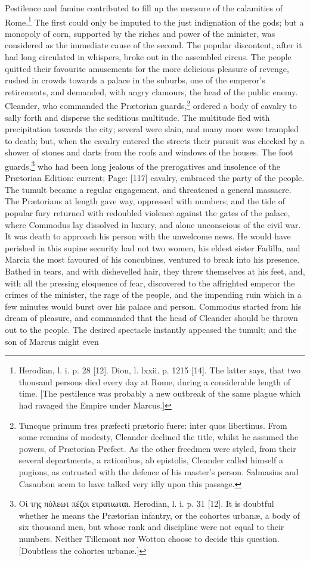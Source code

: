 Pestilence and famine contributed to fill up the measure of the calamities of Rome.\footnote{Herodian, l. i. p. 28 [12]. Dion, l. lxxii. p. 1215 [14]. The latter says, that two thousand persons died every day at Rome, during a considerable length of time. [The pestilence was probably a new outbreak of the same plague which had ravaged the Empire under Marcus.]} The first could only be imputed to the just indignation of the gods; but a monopoly of corn, supported by the riches and power of the minister, was considered as the immediate cause of the second. The popular discontent, after it had long circulated in whispers, broke out in the assembled circus. The people quitted their favourite amusements for the more delicious pleasure of revenge, rushed in crowds towards a palace in the suburbs, one of the emperor\texthebrew{}’s retirements, and demanded, with angry clamours, the head of the public enemy. Cleander, who commanded the Prætorian guards,\footnote{Tuncque primum tres præfecti prætorio fuere: inter quos libertinus. From some remains of modesty, Cleander declined the title, whilst he assumed the powers, of Prætorian Prefect. As the other freedmen were styled, from their several departments, a rationibus, ab epistolis, Cleander called himself a pugions, as entrusted with the defence of his master\texthebrew{}’s person. Salmasius and Casaubon seem to have talked very idly upon this passage.} ordered a body of cavalry to sally forth and disperse the seditious multitude. The multitude fled with precipitation towards the city; several were slain, and many more were trampled to death; but, when the cavalry entered the streets their pursuit was checked by a shower of stones and darts from the roofs and windows of the houses. The foot guards,\footnote{\textgreek{Ο\texthebrew{ἰ} της πόλεωτ πέζοι ετρατιωται}. Herodian, l. i. p. 31 [12]. It is doubtful whether he means the Prætorian infantry, or the cohortes urbanæ, a body of six thousand men, but whose rank and discipline were not equal to their numbers. Neither Tillemont nor Wotton choose to decide this question. [Doubtless the cohortes urbanæ.]} who had been long jealous of the prerogatives and insolence of the Prætorian Edition: current; Page: [117] cavalry, embraced the party of the people. The tumult became a regular engagement, and threatened a general massacre. The Prætorians at length gave way, oppressed with numbers; and the tide of popular fury returned with redoubled violence against the gates of the palace, where Commodus lay dissolved in luxury, and alone unconscious of the civil war. It was death to approach his person with the unwelcome news. He would have perished in this supine security had not two women, his eldest sister Fadilla, and Marcia the most favoured of his concubines, ventured to break into his presence. Bathed in tears, and with dishevelled hair, they threw themselves at his feet, and, with all the pressing eloquence of fear, discovered to the affrighted emperor the crimes of the minister, the rage of the people, and the impending ruin which in a few minutes would burst over his palace and person. Commodus started from his dream of pleasure, and commanded that the head of Cleander should be thrown out to the people. The desired spectacle instantly appeased the tumult; and the son of Marcus might even 